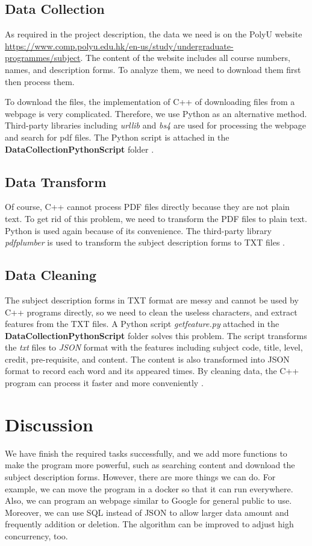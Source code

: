 \documentclass[manuscript,screen,review,12pt]{acmart}
\begin{document}
\subsection{Data Collection}
As required in the project description, the data we need is on the PolyU website \url{https://www.comp.polyu.edu.hk/en-us/study/undergraduate-programmes/subject}. The content of the website includes all course numbers, names, and description forms. To analyze them, we need to download them first then process them.

To download the files, the implementation of C++ of downloading files from a webpage is very complicated. Therefore, we use Python as an alternative method. Third-party libraries including \textit{urllib} and \textit{bs4} are used for processing the webpage and search for pdf files. The Python script is attached in the \textbf{DataCollectionPythonScript} folder \cite{richardson2007beautiful}.

\subsection{Data Transform}
Of course, C++ cannot process PDF files directly because they are not plain text. To get rid of this problem, we need to transform the PDF files to plain text. Python is used again because of its convenience. The third-party library \textit{pdfplumber} is used to transform the subject description forms to TXT files \cite{chen2016information}.

\subsection{Data Cleaning}
The subject description forms in TXT format are messy and cannot be used by C++ programs directly, so we need to clean the useless characters, and extract features from the TXT files. A Python script \textit{getfeature.py} attached in the \textbf{DataCollectionPythonScript} folder solves this problem. The script transforms the \textit{txt} files to \textit{JSON} format with the features including subject code, title, level, credit, pre-requisite, and content. The content is also transformed into JSON format to record each word and its appeared times. By cleaning data, the C++ program can process it faster and more conveniently \cite{lutz2001programming}.

\section{Discussion}
We have finish the required tasks successfully, and we add more functions to make the program more powerful, such as searching content and download the subject description forms. However, there are more things we can do. For example, we can move the program in a docker so that it can run everywhere. Also, we can program an webpage similar to Google for general public to use. Moreover, we can use SQL instead of JSON to allow larger data amount and frequently addition or deletion. The algorithm can be improved to adjust high concurrency, too.
\end{document}
